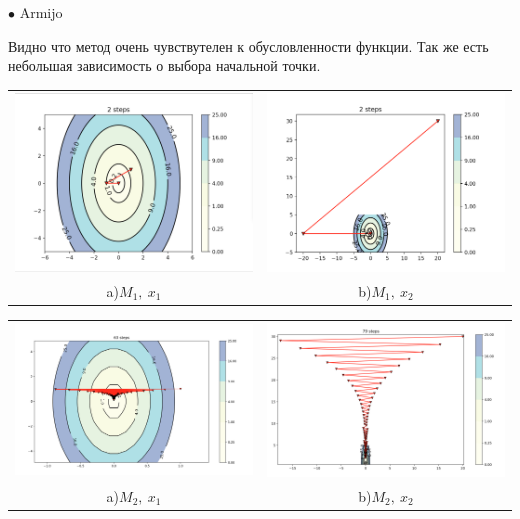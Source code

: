 \documentclass{article}
\theoremstyle{definition}
\theoremstyle{remark}
\begin{document}
$\bullet$ Armijo

Видно что метод очень чувствутелен к обусловленности функции. Так же есть небольшая зависимость о выбора начальной точки.

\begin{center}
\begin{tabular}{cc}
\includegraphics[width=0.49\linewidth]{11.png} &
\includegraphics[width=0.49\linewidth]{12.png} \\
 a)$M_1,\ x_1$ & b)$M_1,\ x_2$\\
\end{tabular}
\end{center}

\begin{center}
\begin{tabular}{cc}
\includegraphics[width=0.49\linewidth]{13.png} &
\includegraphics[width=0.49\linewidth]{14.png} \\
 a)$M_2,\ x_1$ & b)$M_2,\ x_2$\\
\end{tabular}
\end{center}
\end{document}
